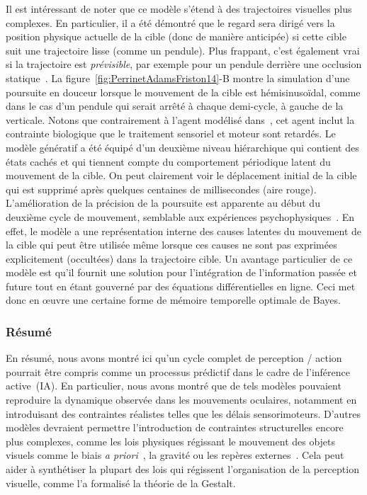 Il est intéressant de noter que ce modèle s'étend à des trajectoires
visuelles plus complexes. En particulier, il a été démontré que le
regard sera dirigé vers la position physique actuelle de la cible (donc
de manière anticipée) si cette cible suit une trajectoire lisse
(comme un pendule). Plus frappant, c'est également vrai si la
trajectoire est \emph{prévisible}, par exemple pour un pendule derrière
une occlusion statique~\citep{Barnes91,Adams12}. La figure~\ref{fig:PerrinetAdamsFriston14}-B montre la simulation d'une poursuite
en douceur lorsque le mouvement de la cible est hémisinusoïdal, comme
dans le cas d'un pendule qui serait arrêté à chaque demi-cycle, à gauche
de la verticale. Notons que contrairement à l'agent modélisé dans~\citep{Adams12}, cet agent inclut la contrainte biologique
que le traitement sensoriel et moteur sont retardés. Le modèle génératif a
été équipé d'un deuxième niveau hiérarchique qui contient des états
cachés et qui tiennent compte du comportement périodique latent du
mouvement de la cible. On peut clairement voir le déplacement initial de
la cible qui est supprimé après quelques centaines de millisecondes
(aire rouge). L'amélioration de la précision de la poursuite
est apparente au début du deuxième cycle de mouvement, semblable aux
expériences psychophysiques~\citep{Barnes91}. En effet, le
modèle a une représentation interne des causes latentes du mouvement de
la cible qui peut être utilisée même lorsque ces causes ne sont pas
exprimées explicitement (occultées) dans la trajectoire cible. Un
avantage particulier de ce modèle est qu'il fournit une solution pour
l'intégration de l'information passée et future tout en étant gouverné
par des équations différentielles en ligne. Ceci met donc en œuvre une
certaine forme de mémoire temporelle optimale de Bayes.

\subsubsection{Résumé}
En résumé, nous avons montré ici qu'un cycle complet de perception
/ action pourrait être compris comme un processus prédictif
dans le cadre de l'inférence active~(IA). En particulier, nous avons
montré que de tels modèles pouvaient reproduire la dynamique observée
dans les mouvements oculaires, notamment en introduisant des contraintes
réalistes telles que les délais sensorimoteurs. D'autres modèles
devraient permettre l'introduction de contraintes structurelles encore
plus complexes, comme les lois physiques régissant le mouvement des
objets visuels comme le biais \emph{a priori}~\citep{Damasse18}, la
gravité ou les repères externes~\citep{Kowler14}. Cela peut aider à
synthétiser la plupart des lois qui régissent l'organisation de la
perception visuelle, comme l'a formalisé la théorie de la Gestalt.

